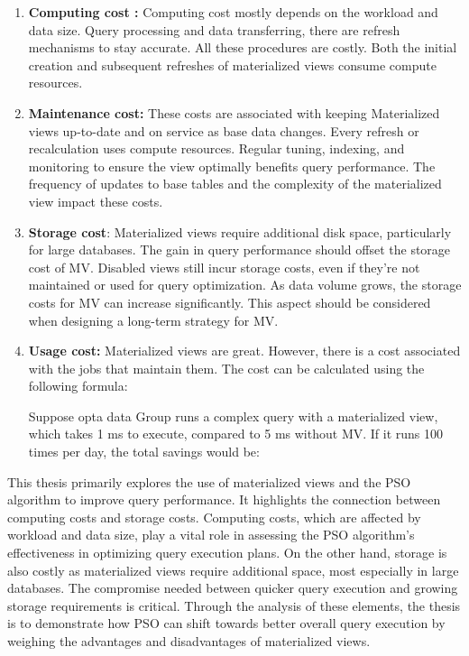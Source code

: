  \begin{enumerate}[label=\alph*)]
    \item \textbf{Computing cost :} Computing cost mostly depends on the workload and data size. Query processing and data transferring, there are refresh mechanisms to stay accurate. All these procedures are costly. Both the initial creation and subsequent refreshes of materialized views consume compute resources.
    
    \item \textbf{Maintenance cost:} These costs are associated with keeping Materialized views up-to-date and on service as base data changes. Every refresh or recalculation uses compute resources. Regular tuning, indexing, and monitoring to ensure the view optimally benefits query performance. The frequency of updates to base tables and the complexity of the materialized view impact these costs. 
    
    \item \textbf{Storage cost}: Materialized views require additional disk space, particularly for large databases. The gain in query performance should offset the storage cost of MV. Disabled views still incur storage costs, even if they're not maintained or used for query optimization. As data volume grows, the storage costs for MV can increase significantly. This aspect should be considered when designing a long-term strategy for MV. 
     
    \item \textbf{Usage cost:} Materialized views are great. However, there is a cost associated with the jobs that maintain them. The cost can be calculated using the following formula\cite{10.1145/2206869.2206874}:

    

  Suppose opta data Group runs a complex query with a materialized view, which takes 1 ms to execute, compared to 5 ms without MV. If it runs 100 times per day, the total savings would be:

  
  
\end{enumerate}

This thesis primarily explores the use of materialized views and the PSO algorithm to improve query performance. It highlights the connection between computing costs and storage costs. Computing costs, which are affected by workload and data size, play a vital role in assessing the PSO algorithm's effectiveness in optimizing query execution plans. On the other hand, storage is also costly as materialized views require additional space, most especially in large databases. The compromise needed between quicker query
execution and growing storage requirements is critical. Through the analysis of these elements, the thesis is to demonstrate how PSO can shift towards better overall query execution by weighing the advantages and disadvantages of materialized views.



